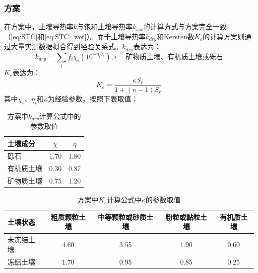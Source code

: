 \subsubsection{\citet{cote2005}方案}
在\citet{cote2005}方案中，土壤导热率$k$与饱和土壤导热率$k_{sat}$的计算方式与\citet{Johansen1975}方案完全一致（\ref{eq:STC}和\ref{eq:STC_wet}）。而干土壤导热率$k_{dry}$和Kersten数$K_e$的计算方案则通过大量实测数据拟合得到经验关系式。$k_{dry}$表达为：
\begin{equation}\label{eq:STC_dry_CK}
k_{dry}=\sum_if_i\chi_i(10^{-\eta_i\theta_s}), i=\text{矿物质土壤、有机质土壤或砾石}
\end{equation}
$K_e$表达为：
\begin{equation}
K_e=\frac{\kappa S_r}{1+(\kappa -1)S_r}
\end{equation}
其中$\chi_i$、$\eta_i$和$\kappa$为经验参数，按照下表取值：
\begin{table}[htbp]
    \centering
    \caption{\citet{cote2005}方案中$k_{dry}$计算公式中的参数取值}
    \begin{tabular}{@{}lcc@{}}
    \toprule
    土壤成分               & $\chi$     & $\eta$  \\
    \midrule
    砾石                  & 1.70      & 1.80  \\
    有机质土壤                  & 0.30    & 0.87   \\
    矿物质土壤         & 0.75   & 1.20    \\
    \bottomrule
    \end{tabular}
\end{table}

\begin{table}[htbp]
    \centering
    \caption{\citet{cote2005}方案中$K_e$计算公式中$\kappa$的参数取值}
    \begin{tabular}{@{}lcccc@{}}
    \toprule
    土壤状态               & 粗质颗粒土壤     & 中等颗粒或砂质土壤 & 粉粒或黏粒土壤 & 有机质土壤  \\
    \midrule
    未冻结土壤             & 4.60      & 3.55   & 1.90    &  0.60  \\
    冻结土壤              & 1.70    & 0.95     & 0.85  & 0.25   \\
    \bottomrule
    \end{tabular}
\end{table}

